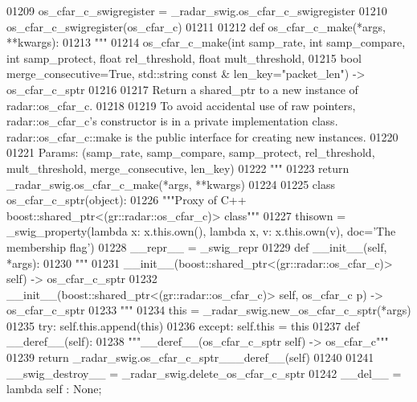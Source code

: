 \begin{DoxyCode}
{{{{{{01209 os\_cfar\_c\_swigregister = \_radar\_swig.os\_cfar\_c\_swigregister
01210 os_cfar_c_swigregister(os\_cfar\_c)
01211 
01212 \textcolor{keyword}{def }os_cfar_c_make(*args, **kwargs):
01213   \textcolor{stringliteral}{"""}
01214 \textcolor{stringliteral}{    os\_cfar\_c\_make(int samp\_rate, int samp\_compare, int samp\_protect, float rel\_threshold, float
       mult\_threshold, }
01215 \textcolor{stringliteral}{        bool merge\_consecutive=True, std::string const & len\_key="packet\_len") -> os\_cfar\_c\_sptr}
01216 \textcolor{stringliteral}{}
01217 \textcolor{stringliteral}{    Return a shared\_ptr to a new instance of radar::os\_cfar\_c.}
01218 \textcolor{stringliteral}{}
01219 \textcolor{stringliteral}{    To avoid accidental use of raw pointers, radar::os\_cfar\_c's constructor is in a private implementation
       class. radar::os\_cfar\_c::make is the public interface for creating new instances.}
01220 \textcolor{stringliteral}{}
01221 \textcolor{stringliteral}{    Params: (samp\_rate, samp\_compare, samp\_protect, rel\_threshold, mult\_threshold, merge\_consecutive,
       len\_key)}
01222 \textcolor{stringliteral}{    """}
01223   \textcolor{keywordflow}{return} \_radar\_swig.os\_cfar\_c\_make(*args, **kwargs)
01224 
01225 \textcolor{keyword}{class }os_cfar_c_sptr(object):
01226     \textcolor{stringliteral}{"""Proxy of C++ boost::shared\_ptr<(gr::radar::os\_cfar\_c)> class"""}
01227     thisown = _swig_property(\textcolor{keyword}{lambda} x: x.this.own(), \textcolor{keyword}{lambda} x, v: x.this.own(v), doc=\textcolor{stringliteral}{'The membership flag'})
01228     \_\_repr\_\_ = \_swig\_repr
01229     \textcolor{keyword}{def }__init__(self, *args): 
01230         \textcolor{stringliteral}{"""}
01231 \textcolor{stringliteral}{        \_\_init\_\_(boost::shared\_ptr<(gr::radar::os\_cfar\_c)> self) -> os\_cfar\_c\_sptr}
01232 \textcolor{stringliteral}{        \_\_init\_\_(boost::shared\_ptr<(gr::radar::os\_cfar\_c)> self, os\_cfar\_c p) -> os\_cfar\_c\_sptr}
01233 \textcolor{stringliteral}{        """}
01234         this = \_radar\_swig.new\_os\_cfar\_c\_sptr(*args)
01235         \textcolor{keywordflow}{try}: self.this.append(this)
01236         \textcolor{keywordflow}{except}: self.this = this
01237     \textcolor{keyword}{def }__deref__(self):
01238         \textcolor{stringliteral}{"""\_\_deref\_\_(os\_cfar\_c\_sptr self) -> os\_cfar\_c"""}
01239         \textcolor{keywordflow}{return} \_radar\_swig.os\_cfar\_c\_sptr\_\_\_deref\_\_(self)
01240 
01241     \_\_swig\_destroy\_\_ = \_radar\_swig.delete\_os\_cfar\_c\_sptr
01242     \_\_del\_\_ = \textcolor{keyword}{lambda} self : \textcolor{keywordtype}{None};
}}}}}}
\end{DoxyCode}
